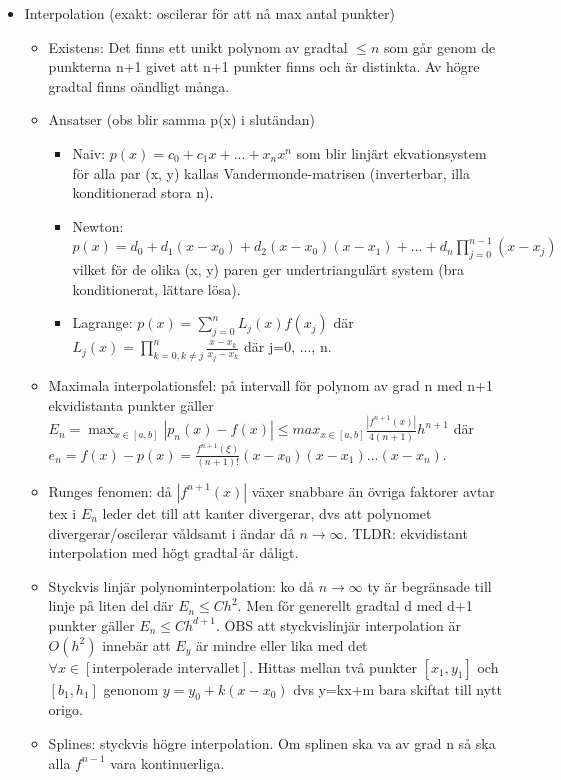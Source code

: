 \documentclass[a4paper]{article}
\begin{document}
\begin{itemize}
    \item Interpolation (exakt: oscilerar för att nå max antal punkter)
        \begin{itemize}
            \item Existens: Det finns ett unikt polynom av gradtal $\leq n$ som går genom de punkterna n+1 givet att n+1 punkter finns och är distinkta. Av högre gradtal finns oändligt många.
            \item Ansatser (obs blir samma p(x) i slutändan)
            \begin{itemize}
                \item Naiv: $p(x)=c_0+c_1x+...+x_nx^n$ som blir linjärt ekvationsystem för alla par (x, y) kallas Vandermonde-matrisen (inverterbar, illa konditionerad stora n).
                \item Newton: $p(x)=d_0+d_1(x-x_0)+d_2(x-x_0)(x-x_1)+...+d_n\prod_{j=0}^{n-1}(x-x_j)$ vilket för de olika (x, y) paren ger undertriangulärt system (bra konditionerat, lättare lösa).
                \item Lagrange: $p(x)=\sum_{j=0}^{n}L_j(x)f(x_j)$ där $L_j(x)=\prod_{k=0, k\neq j}^{n}\frac{x-x_k}{x_j-x_k}$ där j=0, ..., n.
            \end{itemize}
            \item Maximala interpolationsfel: på intervall för polynom av grad n med n+1 ekvidistanta punkter gäller $E_n=\max_{x\in[a, b]}|p_n(x)-f(x)|\leq max_{x\in[a, b]} \frac{|f^{n+1}(x)|}{4(n+1)}h^{n+1}$ där $e_n=f(x)-p(x)=\frac{f^{n+1}(\xi)}{(n+1)!}(x-x_0)(x-x_1)...(x-x_n)$. 
            \item Runges fenomen: då $|f^{n+1}(x)|$ växer snabbare än övriga faktorer avtar tex i $E_n$ leder det till att kanter divergerar, dvs att polynomet divergerar/oscilerar våldsamt i ändar då $n\to\infty$. TLDR: ekvidistant interpolation med högt gradtal är dåligt.
            \item Styckvis linjär polynominterpolation: ko då $n\to\infty$ ty är begränsade till linje på liten del där $E_n\leq Ch^2$. Men för generellt gradtal d med d+1 punkter gäller $E_n\leq Ch^{d+1}$. OBS att styckvislinjär interpolation är $O(h^2)$ innebär att $E_y$ är mindre eller lika med det $\forall x\in [\text{interpolerade intervallet}]$. Hittas mellan två punkter $[x_1, y_1]$ och $[b_1, h_1]$ genonom $y=y_0+k(x-x_0)$ dvs y=kx+m bara skiftat till nytt origo.
            \item Splines: styckvis högre interpolation. Om splinen ska va av grad n så ska alla $f^{n-1}$ vara kontinuerliga.

\end{itemize}
\end{itemize}
\end{document}
